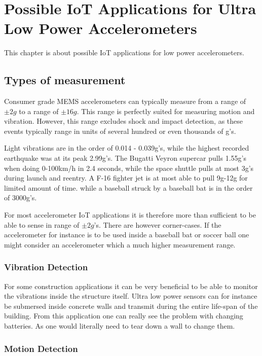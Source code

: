 \chapter{Possible IoT Applications for Ultra Low Power Accelerometers}

This chapter is about possible IoT applications for low power accelerometers.

\section{Types of measurement}

Consumer grade MEMS accelerometers can typically measure from a range of $\pm2g$ to a range of $\pm16g$. This range is perfectly suited for measuring motion and vibration.  However, this range excludes shock and impact detection, as these events typically range in units of several hundred or even thousands of g's.

Light vibrations are in the order of 0.014 - 0.039g's, while the highest recorded earthquake was at its peak 2.99g's. The Bugatti Veyron supercar pulls 1.55g's when doing 0-100km/h in 2.4 seconds, while the space shuttle pulls at most 3g's during launch and reentry. A F-16 fighter jet is at most able to pull 9g-12g for limited amount of time.  while a baseball struck by a baseball bat is in the order of 3000g's.

For most accelerometer IoT applications it is therefore more than sufficient to be able to sense in range of $\pm2g$'s. There are however corner-cases. If the accelerometer for instance is to be used inside a baseball bat or soccer ball one might consider an accelerometer which a much higher measurement range.


\subsection{Vibration Detection}

For some construction applications it can be very beneficial to be able to monitor the vibrations inside the structure itself. Ultra low power sensors can for instance be submersed inside concrete walls and transmit during the entire life-span of the building. From this application one can really see the problem with changing batteries. As one would literally need to tear down a wall to change them. 

\subsection{Motion Detection}

